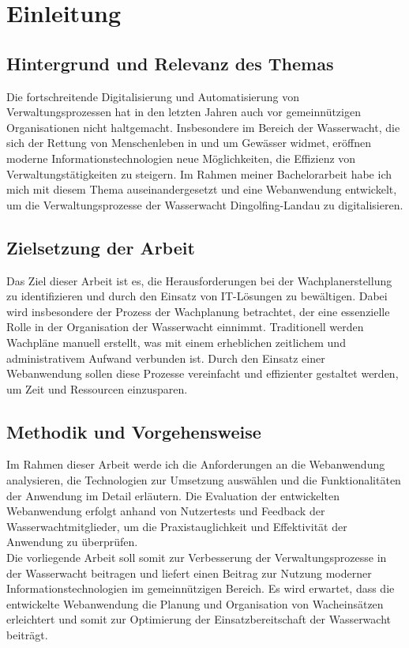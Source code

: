 \documentclass[fontsize=12pt,openright,oneside,paper=a4,BCOR=1cm]{scrbook}
\begin{document}



\tableofcontents

%
%

\chapter{Einleitung}
\section{Hintergrund und Relevanz des Themas}
Die fortschreitende Digitalisierung und Automatisierung von Verwaltungsprozessen hat in den letzten Jahren auch vor gemeinnützigen Organisationen nicht haltgemacht. Insbesondere im Bereich der Wasserwacht, die sich der Rettung von Menschenleben in und um Gewässer widmet, eröffnen moderne Informationstechnologien neue Möglichkeiten, die Effizienz von Verwaltungstätigkeiten zu steigern. Im Rahmen meiner Bachelorarbeit habe ich mich mit diesem Thema auseinandergesetzt und eine Webanwendung entwickelt, um die Verwaltungsprozesse der Wasserwacht Dingolfing-Landau zu digitalisieren. 
\\
\section{Zielsetzung der Arbeit}
Das Ziel dieser Arbeit ist es, die Herausforderungen bei der Wachplanerstellung zu identifizieren und durch den Einsatz von IT-Lösungen zu bewältigen. Dabei wird insbesondere der Prozess der Wachplanung betrachtet, der eine essenzielle Rolle in der Organisation der Wasserwacht einnimmt. Traditionell werden Wachpläne manuell erstellt, was mit einem erheblichen zeitlichem und administrativem Aufwand verbunden ist. Durch den Einsatz einer Webanwendung sollen diese Prozesse vereinfacht und effizienter gestaltet werden, um Zeit und Ressourcen einzusparen. 
\\
\section{Methodik und Vorgehensweise}
Im Rahmen dieser Arbeit werde ich die Anforderungen an die Webanwendung analysieren, die Technologien zur Umsetzung auswählen und die Funktionalitäten der Anwendung im Detail erläutern. Die Evaluation der entwickelten Webanwendung erfolgt anhand von Nutzertests und Feedback der Wasserwachtmitglieder, um die Praxistauglichkeit und Effektivität der Anwendung zu überprüfen. 
\\
Die vorliegende Arbeit soll somit zur Verbesserung der Verwaltungsprozesse in der Wasserwacht beitragen und liefert einen Beitrag zur Nutzung moderner Informationstechnologien im gemeinnützigen Bereich. Es wird erwartet, dass die entwickelte Webanwendung die Planung und Organisation von Wacheinsätzen erleichtert und somit zur Optimierung der Einsatzbereitschaft der Wasserwacht beiträgt. 
\\
\end{document}
